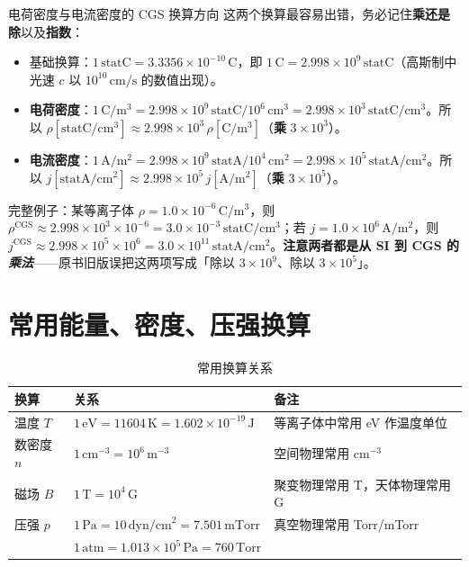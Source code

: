 \documentclass[12pt,a4paper,openany,oneside]{book}
\begin{document}
\begin{warning}{电荷密度与电流密度的 CGS 换算方向}{}
这两个换算最容易出错，务必记住\textbf{乘还是除}以及\textbf{指数}：
\begin{itemize}
    \item 基础换算：$1\,\mathrm{statC} = 3.3356\times 10^{-10}\,\mathrm{C}$，即 $1\,\mathrm{C} = 2.998\times 10^{9}\,\mathrm{statC}$（高斯制中光速 $c$ 以 $10^{10}\,\mathrm{cm/s}$ 的数值出现）。
    \item \textbf{电荷密度}：$1\,\mathrm{C/m^3} = 2.998\times10^{9}\,\mathrm{statC}/10^{6}\,\mathrm{cm^3} = 2.998\times10^{3}\,\mathrm{statC/cm^3}$。所以 $\rho[\mathrm{statC/cm^3}] \approx 2.998\times10^{3}\,\rho[\mathrm{C/m^3}]$（\textbf{乘} $3\times10^{3}$）。
    \item \textbf{电流密度}：$1\,\mathrm{A/m^2} = 2.998\times10^{9}\,\mathrm{statA}/10^{4}\,\mathrm{cm^2} = 2.998\times10^{5}\,\mathrm{statA/cm^2}$。所以 $j[\mathrm{statA/cm^2}] \approx 2.998\times10^{5}\,j[\mathrm{A/m^2}]$（\textbf{乘} $3\times10^{5}$）。
\end{itemize}
完整例子：某等离子体 $\rho = 1.0\times10^{-6}\,\mathrm{C/m^3}$，则 $\rho^\text{CGS} \approx 2.998\times10^{3}\times10^{-6} = 3.0\times10^{-3}\,\mathrm{statC/cm^3}$；若 $j = 1.0\times10^{6}\,\mathrm{A/m^2}$，则 $j^\text{CGS}\approx 2.998\times10^{5}\times10^{6} = 3.0\times10^{11}\,\mathrm{statA/cm^2}$。\textbf{注意两者都是从 SI 到 CGS 的\emph{乘法}}——原书旧版误把这两项写成「除以 $3\times10^9$、除以 $3\times10^5$」。
\end{warning}


\section{常用能量、密度、压强换算}

\begin{table}[htbp]
\centering
\caption{常用换算关系}
\label{tab:common-conversion}
\begin{tabular}{@{}lll@{}}
\toprule
\textbf{换算} & \textbf{关系} & \textbf{备注} \\
\midrule
温度 $T$ & $1\,\text{eV} = 11604\,\text{K} = 1.602\times 10^{-19}\,\text{J}$ & 等离子体中常用 eV 作温度单位 \\
数密度 $n$ & $1\,\text{cm}^{-3} = 10^6\,\text{m}^{-3}$ & 空间物理常用 cm$^{-3}$ \\
磁场 $B$ & $1\,\text{T} = 10^4\,\text{G}$ & 聚变物理常用 T，天体物理常用 G \\
压强 $p$ & $1\,\text{Pa} = 10\,\text{dyn/cm}^2 = 7.501\,\text{mTorr}$ & 真空物理常用 Torr/mTorr \\
& $1\,\text{atm} = 1.013\times 10^5\,\text{Pa} = 760\,\text{Torr}$ & \\
\bottomrule
\end{tabular}
\end{table}
\end{document}
